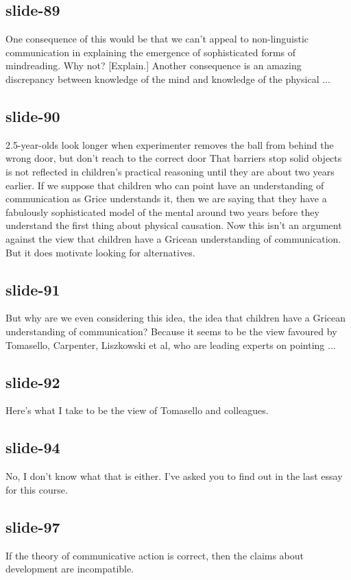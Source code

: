\documentclass[12pt,\papersize]{extarticle}
\begin{document}
 
\subsection{slide-89}
One consequence of this would be that we can't appeal to non-linguistic communication in explaining the emergence of sophisticated forms of mindreading.
Why not? [Explain.]
Another consequence is an amazing discrepancy between knowledge of the mind and knowledge of the physical ...
 
 
\subsection{slide-90}
2.5-year-olds look longer when experimenter removes the ball from behind the wrong door, but don't reach to the correct door
That barriers stop solid objects is not reflected in children's practical reasoning until they are about two years earlier.
If we suppose that children who can point have an understanding of communication as Grice understands it, then we are saying that they have a fabulously sophisticated model of the mental around two years before they understand the first thing about physical causation.
Now this isn't an argument against the view that children have a Gricean understanding of communication.
But it does motivate looking for alternatives.
 
 
\subsection{slide-91}
But why are we even considering this idea, the idea that children have a Gricean understanding of communication?
Because it seems to be the view favoured by Tomasello, Carpenter, Liszkowski et al, who are leading experts on pointing ...
 
 
\subsection{slide-92}
Here's what I take to be the view of Tomasello and colleagues.
 
 
\subsection{slide-94}
No, I don't know what that is either. I've asked you to find out in the last essay for this course.
 
 
\subsection{slide-97}
If the theory of communicative action is correct, then the claims about development are incompatible.
 
\end{document}
